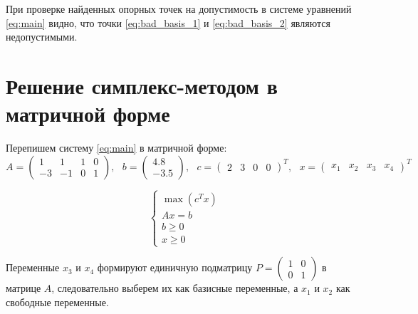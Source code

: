 При проверке найденных опорных точек на допустимость в системе уравнений \ref{eq:main} видно, что точки \ref{eq:bad_basis_1} и \ref{eq:bad_basis_2} являются недопустимыми.

\section{Решение симплекс-методом в матричной форме}

Перепишем систему \ref{eq:main} в матричной форме:
\begin{equation*}
A = 
\begin{pmatrix}
	1 & 1 & 1 & 0 \\
	-3 & -1 & 0 & 1
\end{pmatrix},\text{ }
b = 
\begin{pmatrix}
	4.8 \\
	-3.5
\end{pmatrix},\text{ }
c = 
\begin{pmatrix}
	2 & 3 & 0 & 0
\end{pmatrix}^T,\text{ }
x = 
\begin{pmatrix}
	x_1 & x_2 & x_3 & x_4
\end{pmatrix}^T
\end{equation*}

\begin{equation}
\begin{cases}
	\max (c^Tx) \\
	A x = b \\
	b \ge 0 \\
	x \ge 0
\end{cases}
\end{equation}

Переменные $x_3$ и $x_4$ формируют единичную подматрицу $P = \left( \begin{smallmatrix} 1 & 0 \\ 0 & 1 \end{smallmatrix} \right)$ в матрице $A$, следовательно выберем их как базисные переменные, а $x_1$ и $x_2$ как свободные переменные.

